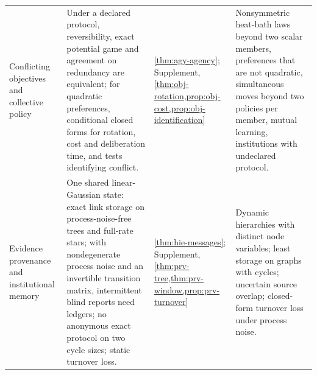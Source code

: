 \begin{table}[p]
\begin{tabular}{@{}>{\raggedright\arraybackslash}p{}>{\raggedright\arraybackslash}p{}>{\raggedright\arraybackslash}p{}>{\raggedright\arraybackslash}p{}@{}}
\addlinespace
Conflicting objectives and collective policy & Under a declared protocol, reversibility, exact potential game and agreement on redundancy are equivalent; for quadratic preferences, conditional closed forms for rotation, cost and deliberation time, and tests identifying conflict. & \cref{thm:agy-agency}; Supplement, \cref{thm:obj-rotation,prop:obj-cost,prop:obj-identification} & Nonsymmetric heat-bath laws beyond two scalar members, preferences that are not quadratic, simultaneous moves beyond two policies per member, mutual learning, institutions with undeclared protocol. \\
\addlinespace
Evidence provenance and institutional memory & One shared linear-Gaussian state: exact link storage on process-noise-free trees and full-rate stars; with nondegenerate process noise and an invertible transition matrix, intermittent blind reports need ledgers; no anonymous exact protocol on two cycle sizes; static turnover loss. & \cref{thm:hie-messages}; Supplement, \cref{thm:prv-tree,thm:prv-window,prop:prv-turnover} & Dynamic hierarchies with distinct node variables; least storage on graphs with cycles; uncertain source overlap; closed-form turnover loss under process noise. \\
\bottomrule
\end{tabular}
\end{table}

